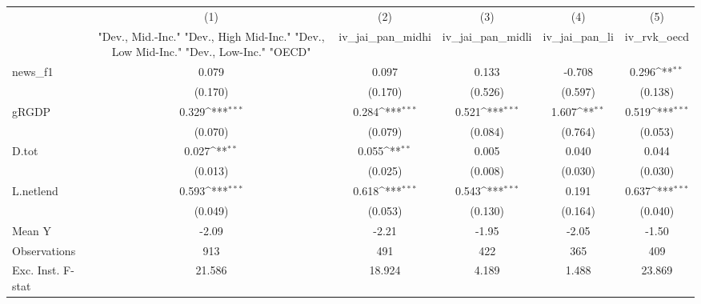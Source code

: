 {
\def\sym#1{\ifmmode^{#1}\else\(^{#1}\)\fi}
\begin{tabular}{l*{5}{c}}
\toprule
            &\multicolumn{1}{c}{(1)}&\multicolumn{1}{c}{(2)}&\multicolumn{1}{c}{(3)}&\multicolumn{1}{c}{(4)}&\multicolumn{1}{c}{(5)}\\
            &\multicolumn{1}{c}{ "Dev., Mid.-Inc." "Dev., High Mid-Inc." "Dev., Low Mid-Inc." "Dev., Low-Inc." "OECD" }&\multicolumn{1}{c}{iv\_jai\_pan\_midhi}&\multicolumn{1}{c}{iv\_jai\_pan\_midli}&\multicolumn{1}{c}{iv\_jai\_pan\_li}&\multicolumn{1}{c}{iv\_rvk\_oecd}\\
\midrule
news\_f1     &       0.079         &       0.097         &       0.133         &      -0.708         &       0.296\sym{**} \\
            &     (0.170)         &     (0.170)         &     (0.526)         &     (0.597)         &     (0.138)         \\
\addlinespace
gRGDP       &       0.329\sym{***}&       0.284\sym{***}&       0.521\sym{***}&       1.607\sym{**} &       0.519\sym{***}\\
            &     (0.070)         &     (0.079)         &     (0.084)         &     (0.764)         &     (0.053)         \\
\addlinespace
D.tot       &       0.027\sym{**} &       0.055\sym{**} &       0.005         &       0.040         &       0.044         \\
            &     (0.013)         &     (0.025)         &     (0.008)         &     (0.030)         &     (0.030)         \\
\addlinespace
L.netlend   &       0.593\sym{***}&       0.618\sym{***}&       0.543\sym{***}&       0.191         &       0.637\sym{***}\\
            &     (0.049)         &     (0.053)         &     (0.130)         &     (0.164)         &     (0.040)         \\
\midrule
Mean Y      &       -2.09         &       -2.21         &       -1.95         &       -2.05         &       -1.50         \\
Observations&         913         &         491         &         422         &         365         &         409         \\
Exc. Inst. F-stat&      21.586         &      18.924         &       4.189         &       1.488         &      23.869         \\
\bottomrule
\end{tabular}
}
